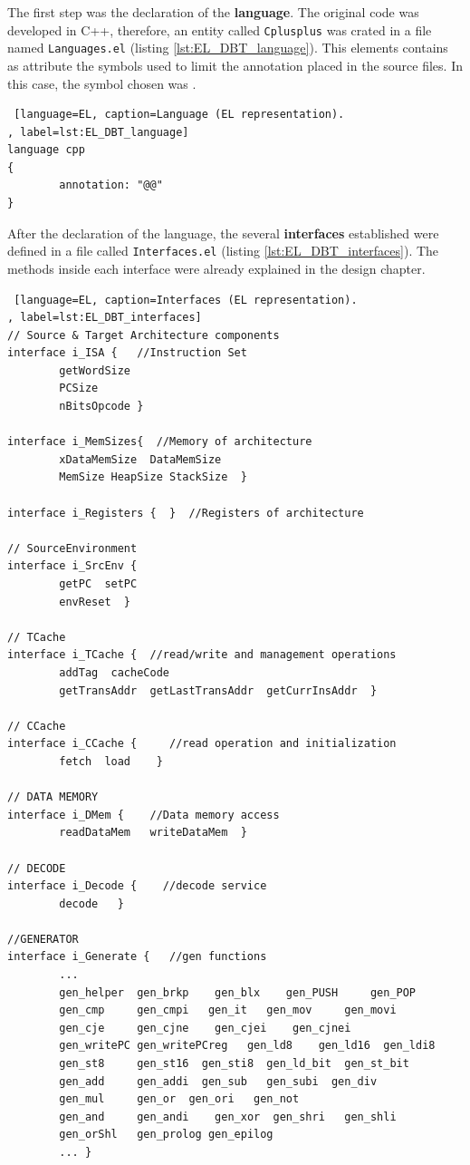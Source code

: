 \documentclass[12pt]{article}
\newcounter{subsubsubsection}[subsubsection]
\begin{document}
{
The first step was the declaration of the \textbf{language}. The original code was developed in C++, therefore, an entity called \texttt{Cplusplus} was crated in a file named \texttt{Languages.el} (listing \ref{lst:EL_DBT_language}). This elements contains as attribute the symbols used to limit the annotation placed in the source files. In this case, the symbol chosen was \texttt{\@\@}.


\begin{lstlisting} [language=EL, caption=Language (EL representation).
, label=lst:EL_DBT_language]
language cpp
{
		annotation: "@@"
}
\end{lstlisting}

After the declaration of the language, the several \textbf{interfaces} established were defined in a file called \texttt{Interfaces.el} (listing \ref{lst:EL_DBT_interfaces}). The methods inside each interface were already explained in the design chapter.

\begin{lstlisting} [language=EL, caption=Interfaces (EL representation).
, label=lst:EL_DBT_interfaces]
// Source & Target Architecture components 
interface i_ISA {   //Instruction Set 
		getWordSize	
		PCSize
		nBitsOpcode }
    
interface i_MemSizes{  //Memory of architecture
		xDataMemSize  DataMemSize 	
		MemSize	HeapSize StackSize  }

interface i_Registers {	 }  //Registers of architecture 

// SourceEnvironment 
interface i_SrcEnv {   
		getPC  setPC
		envReset  }

// TCache 
interface i_TCache {  //read/write and management operations
		addTag 	cacheCode			
		getTransAddr  getLastTransAddr  getCurrInsAddr  }

// CCache 
interface i_CCache {     //read operation and initialization
		fetch  load    }

// DATA MEMORY 
interface i_DMem {    //Data memory access
		readDataMem   writeDataMem	}

// DECODE 
interface i_Decode {    //decode service
		decode   }

//GENERATOR 
interface i_Generate {   //gen functions
		...
		gen_helper	gen_brkp  	gen_blx    gen_PUSH  	gen_POP
		gen_cmp 	gen_cmpi   gen_it   gen_mov  	gen_movi
		gen_cje  	gen_cjne	gen_cjei  	gen_cjnei
		gen_writePC gen_writePCreg   gen_ld8  	gen_ld16  gen_ldi8
		gen_st8	 	gen_st16  gen_sti8  gen_ld_bit  gen_st_bit
		gen_add  	gen_addi  gen_sub  	gen_subi  gen_div  
		gen_mul     gen_or  gen_ori   gen_not
		gen_and  	gen_andi    gen_xor  gen_shri 	gen_shli
		gen_orShl   gen_prolog gen_epilog
        ... }
    

\end{lstlisting}}
\end{document}
